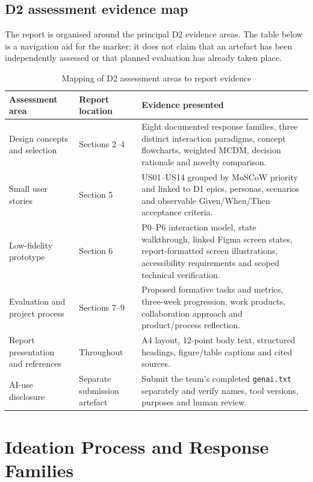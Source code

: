 \documentclass[12pt,a4paper]{article}
\newcommand{\code}[1]{\texttt{#1}}
\begin{document}
\subsection{D2 assessment evidence map}
The report is organised around the principal D2 evidence areas. The table below is a navigation aid for the marker; it does not claim that an artefact has been independently assessed or that planned evaluation has already taken place.

\begin{table}[H]
\centering
\small
\caption{Mapping of D2 assessment areas to report evidence}
\label{tab:assessment-map}
\begin{tabularx}{\textwidth}{@{}>{\raggedright\arraybackslash}p{3.1cm}>{\raggedright\arraybackslash}p{2.6cm}X@{}}
\toprule
\textbf{Assessment area} & \textbf{Report location} & \textbf{Evidence presented}\\
\midrule
Design concepts and selection & Sections 2--4 & Eight documented response families, three distinct interaction paradigms, concept flowcharts, weighted MCDM, decision rationale and novelty comparison.\\
\rowcolor{RowGray}
Small user stories & Section 5 & US01--US14 grouped by MoSCoW priority and linked to D1 epics, personas, scenarios and observable Given/When/Then acceptance criteria.\\
Low-fidelity prototype & Section 6 & P0--P6 interaction model, state walkthrough, linked Figma screen states, report-formatted screen illustrations, accessibility requirements and scoped technical verification.\\
\rowcolor{RowGray}
Evaluation and project process & Sections 7--9 & Proposed formative tasks and metrics, three-week progression, work products, collaboration approach and product/process reflection.\\
Report presentation and references & Throughout & A4 layout, 12-point body text, structured headings, figure/table captions and cited sources.\\
\rowcolor{RowGray}
AI-use disclosure & Separate submission artefact & Submit the team's completed \code{genai.txt} separately and verify names, tool versions, purposes and human review.\\
\bottomrule
\end{tabularx}
\end{table}

\section{Ideation Process and Response Families}
\end{document}
